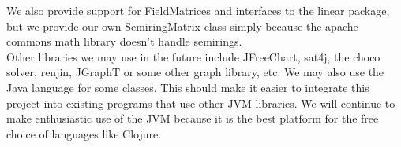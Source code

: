 \documentclass[a4paper,11pt]{report}
\begin{document}
We also provide support for FieldMatrices and interfaces to the linear package, but we provide our own SemiringMatrix class simply because the apache commons math library doesn't handle semirings. \\ 

Other libraries we may use in the future include JFreeChart, sat4j, the choco solver, renjin, JGraphT or some other graph library, etc. We may also use the Java language for some classes. This should make it easier to integrate this project into existing programs that use other JVM libraries. We will continue to make enthusiastic use of the JVM because it is the best platform for the free choice of languages like Clojure.
\end{document}
